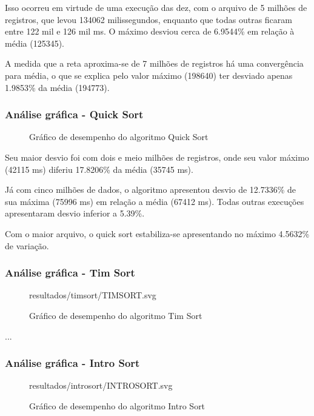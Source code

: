 \documentclass[a4paper,12pt]{scrartcl}
\begin{document}
Isso ocorreu em virtude de uma execução das dez, com o arquivo de 5 milhões de registros, que levou 134062 milissegundos, enquanto que todas outras ficaram entre 122 mil e 126 mil ms. O máximo desviou cerca de 6.9544\% em relação à média (125345).

A medida que a reta aproxima-se de 7 milhões de registros há uma convergência para média, o que se explica pelo valor máximo (198640) ter desviado apenas 1.9853\% da média (194773).

\subsubsection{Análise gráfica - Quick Sort}
\begin{figure}[H]
    \centering
    
    \caption{Gráfico de desempenho do algoritmo Quick Sort}
    \label{mapaSelect}
\end{figure}

Seu maior desvio foi com dois e meio milhões de registros, onde seu valor máximo (42115 ms) diferiu 17.8206\% da média (35745 ms).

Já com cinco milhões de dados, o algoritmo apresentou desvio de 12.7336\% de sua máxima (75996 ms) em relação a média (67412 ms). Todas outras execuções apresentaram desvio inferior a 5.39\%.

Com o maior arquivo, o quick sort estabiliza-se apresentando no máximo 4.5632\% de variação.

\subsubsection{Análise gráfica - Tim Sort}
\begin{figure}[H]
    \centering
    
    {resultados/timsort/TIMSORT.svg}
    \caption{Gráfico de desempenho do algoritmo Tim Sort}
    \label{mapaSelect}
\end{figure}

...

\subsubsection{Análise gráfica - Intro Sort}
\begin{figure}[H]
    \centering
    
    {resultados/introsort/INTROSORT.svg}
    \caption{Gráfico de desempenho do algoritmo Intro Sort}
    \label{mapaSelect}
\end{figure}
\end{document}
